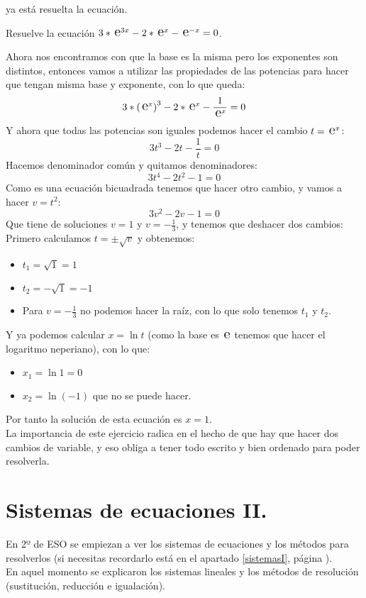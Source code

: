 \documentclass[a4paper,11pt,answers]{exam}
\newcommand{\e}{\,\text{\Large e}}
\begin{document}
\begin{itemize}
\begin{questions}
\begin{solution}
      ya está resuelta la ecuación.
    \end{solution}
  \question Resuelve la ecuación $3*\e^{3x} - 2*\e^x - \e^{-x} = 0$.
    \begin{solution}
      Ahora nos encontramos con que la base es la misma pero los exponentes son distintos,
      entonces vamos a utilizar las propiedades de las potencias para hacer que tengan misma
      base y exponente, con lo que queda:
      \[3*\left(\e^x\right)^3 - 2*\e^x - \frac{1}{\e^x} = 0\]
      Y ahora que todas las potencias son iguales podemos hacer el cambio $t = \e^x$:
      \[3t^3 - 2t - \frac{1}{t} = 0\]
      Hacemos denominador común y quitamos denominadores:
      \[3t^4 - 2t^2 - 1 = 0\]
      Como es una ecuación bicuadrada tenemos que hacer otro cambio, y vamos a hacer $v = t^2$:
      \[3v^2 - 2v - 1 = 0\]
      Que tiene de soluciones $v = 1$ y $v = -\frac{1}{3}$, y tenemos que deshacer dos cambios:\\

      Primero calculamos $t = \pm \sqrt{v}$ y obtenemos:
      \begin{itemize}
      \item $t_1 = \sqrt{1} = 1$
      \item $t_2 = -\sqrt{1} = -1$
      \item Para $v = -\frac{1}{3}$ no podemos hacer la raíz, con lo que solo tenemos $t_1$ y $t_2$.
      \end{itemize}

      Y ya podemos calcular $x = \ln t$ (como la base es $\e$ tenemos que hacer el logaritmo
      neperiano), con lo que:
      \begin{itemize}
      \item $x_1 = \ln 1 = 0$
      \item $x_2 = \ln (-1)$ que no se puede hacer.
      \end{itemize}
      Por tanto la solución de esta ecuación es $x=1$.\\

      La importancia de este ejercicio radica en el hecho de que hay que hacer dos cambios de
      variable, y eso obliga a tener todo escrito y bien ordenado para poder resolverla.
    \end{solution}
  \end{questions}
\end{itemize}

\section{Sistemas de ecuaciones II.}
En 2º de ESO se empiezan a ver los sistemas de ecuaciones y los métodos para resolverlos
(si necesitas recordarlo está en el apartado \ref{sistemasI}, página \pageref{sistemasI}).\\
En aquel momento se explicaron los sistemas lineales y los métodos de resolución (sustitución,
reducción e igualación).\\
\end{document}
